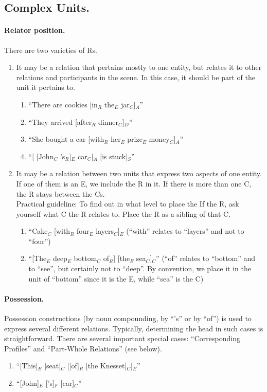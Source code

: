 \documentclass[11pt]{article}
\newcommand{\be}{\begin{enumerate}}
\newcommand{\ee}{\end{enumerate}}
\begin{document}
\subsection*{Complex Units.}



\paragraph{Relator position.} There are two varieties of Rs.
\be \item
It may be a relation that pertains mostly to one entity, but relates it to other relations and participants in the scene. In this case, it should be part of the unit it pertains to.
\be \item
``There are cookies [in$_R$ the$_E$ jar$_C$]$_A$''
\item
``They arrived [after$_R$ dinner$_C$]$_D$''
\item
``She bought a car [with$_R$ her$_E$ prize$_E$ money$_C$]$_A$''
\item
``[ [John$_C$ 's$_R$]$_E$ car$_C$]$_A$ [is stuck]$_S$''
\ee
\item
It may be a relation between two units that express two aspects of one entity. If one of them is an E, we include the R in it. If there is more than one C, the R stays between the Cs. \\
Practical guideline: To find out in what level to place the If the R, ask yourself what C the R relates to. Place the R as a sibling of that C.
\be \item
``Cake$_C$ [with$_R$ four$_E$ layers$_C$]$_E$ (``with'' relates to ``layers'' and not to ``four'')
\item
``[The$_E$ deep$_E$ bottom$_C$ of$_R$] [the$_E$ sea$_C$]$_C$'' (``of'' relates to ``bottom'' and to ``see'', but certainly not to ``deep''. By convention, we place it in the unit of ``bottom'' since it is the E, while ``sea'' is the C)
\ee
\ee

\paragraph{Possession.} Possession constructions (by noun compounding, by ``'s'' or by ``of'') is used to express several different relations. Typically, determining the head in such cases is straightforward. There are several important special cases: ``Corresponding Profiles'' and ``Part-Whole Relations'' (see below).
\be \item
``[This]$_E$ [seat]$_C$ [[of]$_R$ [the Knesset]$_C$]$_E$''
\item
``[John]$_E$ ['s]$_F$ [car]$_C$''
\ee
\end{document}

